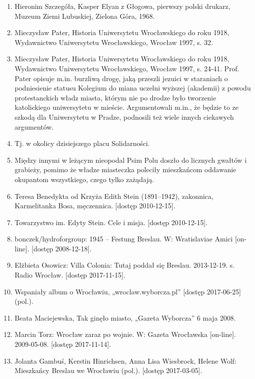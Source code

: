 \documentclass{article}
\begin{document}
\begin{multicols}{3}
\begin{enumerate}
            \item   \hypertarget{11}{Hieronim Szczegóła, Kasper Elyan z Głogowa, pierwszy polski drukarz, Muzeum Ziemi Lubuskiej, Zielona Góra, 1968.}
            \item   \hypertarget{12}{Mieczysław Pater, Historia Uniwersytetu Wrocławskiego do roku 1918, Wydawnictwo Uniwersytetu Wrocławskiego, Wrocław 1997, s. 32.}
            \item   \hypertarget{13}{Mieczysław Pater, Historia Uniwersytetu Wrocławskiego do roku 1918, Wydawnictwo Uniwersytetu Wrocławskiego, Wrocław 1997, s. 24-41. Prof. Pater opisuje m.in. burzliwą drogę, jaką przeszli jezuici w staraniach o podniesienie statusu Kolegium do miana uczelni wyższej (akademii) z powodu protestanckich władz miasta, którym nie po drodze było tworzenie katolickiego uniwersytetu w mieście. Argumentowali m.in., że będzie to ze szkodą dla Uniwersytetu w Pradze, podnosili też wiele innych ciekawych argumentów.}
            \item   \hypertarget{14}{Tj. w okolicy dzisiejszego placu Solidarności.}
            \item   \hypertarget{15}{Między innymi w leżącym nieopodal Psim Polu doszło do licznych gwałtów i grabieży, pomimo że władze miasteczka poleciły mieszkańcom oddawanie okupantom wszystkiego, czego tylko zażądają.}
            \item   \hypertarget{16}{Teresa Benedykta od Krzyża Edith Stein (1891–1942), zakonnica, Karmelitanka Bosa, męczennica. [dostęp 2010-12-15].}
            \item   \hypertarget{17}{Towarzystwo im. Edyty Stein. Cele i misja. [dostęp 2010-12-15].}
            \item   \hypertarget{18}{bonczek/hydroforgroup: 1945 – Festung Breslau. W: Wratislaviae Amici [on-line]. [dostęp 2008-12-18].}
            \item   \hypertarget{19}{Elżbieta Osowicz: Villa Colonia: Tutaj poddał się Breslau. 2013-12-19. s. Radio Wrocław. [dostęp 2017-11-15].}
            \item   \hypertarget{20}{Wspaniały album o Wrocławiu, „wroclaw.wyborcza.pl” [dostęp 2017-06-25] (pol.).}
            \item   \hypertarget{21}{Beata Maciejewska, Tak ginęło miasto, „Gazeta Wyborcza” 6 maja 2008.}
            \item   \hypertarget{22}{Marcin Torz: Wrocław zaraz po wojnie. W: Gazeta Wrocławska [on-line]. 2009-05-08. [dostęp 2017-11-14].}
            \item   \hypertarget{23}{Jolanta Gambuś, Kerstin Hinrichsen, Anna Lisa Wiesbrock, Helene Wolf: Mieszkańcy Breslau we Wrocławiu (pol.). [dostęp 2017-03-05].}

\end{enumerate}
\end{multicols}
\end{document}
